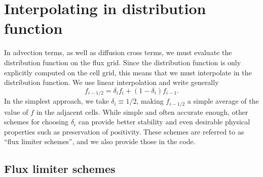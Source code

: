 \documentclass{notes}
\begin{document}
    \section{Interpolating in distribution function}\label{sec:interp}
    In advection terms, as well as diffusion cross terms, we must evaluate the
    distribution function on the flux grid. Since the distribution function is
    only explicitly computed on the cell grid, this means that we must
    interpolate in the distribution function. We use linear interpolation and
    write generally
    \begin{equation}
        f_{i-1/2} = \delta_{i} f_i + \left( 1 - \delta_i \right) f_{i-1}.
    \end{equation}
    In the simplest approach, we take $\delta_i\equiv 1/2$, making $f_{i-1/2}$
    a simple average of the value of $f$ in the adjacent cells. While simple and
    often accurate enough, other schemes for choosing $\delta_i$ can provide
    better stability and even desirable physical properties such as preservation
    of positivity. These schemes are referred to as ``flux limiter schemes'',
    and we also provide those in the code.

    \subsection{Flux limiter schemes}

    \printbibliography
\end{document}
